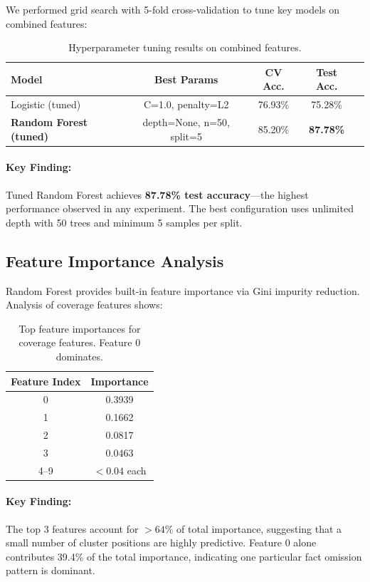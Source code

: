 \documentclass[12pt,a4paper]{article}
\begin{document}
We performed grid search with 5-fold cross-validation to tune key models on combined features:

\begin{table}[h]
\centering
\begin{tabular}{lcccc}
\hline
\textbf{Model} & \textbf{Best Params} & \textbf{CV Acc.} & \textbf{Test Acc.} \\
\hline
Logistic (tuned) & C=1.0, penalty=L2 & 76.93\% & 75.28\% \\
\textbf{Random Forest (tuned)} & depth=None, n=50, split=5 & 85.20\% & \textbf{87.78\%} \\
\hline
\end{tabular}
\caption{Hyperparameter tuning results on combined features.}
\label{tab:tuning_results}
\end{table}

\paragraph{Key Finding:} Tuned Random Forest achieves \textbf{87.78\% test accuracy}---the
highest performance observed in any experiment. The best configuration uses unlimited depth
with 50 trees and minimum 5 samples per split.

\subsection{Feature Importance Analysis}

Random Forest provides built-in feature importance via Gini impurity reduction.
Analysis of coverage features shows:

\begin{table}[h]
\centering
\begin{tabular}{cc}
\hline
\textbf{Feature Index} & \textbf{Importance} \\
\hline
0 & 0.3939 \\
1 & 0.1662 \\
2 & 0.0817 \\
3 & 0.0463 \\
4--9 & $<0.04$ each \\
\hline
\end{tabular}
\caption{Top feature importances for coverage features. Feature 0 dominates.}
\label{tab:feature_importance}
\end{table}

\paragraph{Key Finding:} The top 3 features account for $>64\%$ of total importance, suggesting
that a small number of cluster positions are highly predictive. Feature 0 alone contributes
39.4\% of the total importance, indicating one particular fact omission pattern is dominant.
\end{document}

